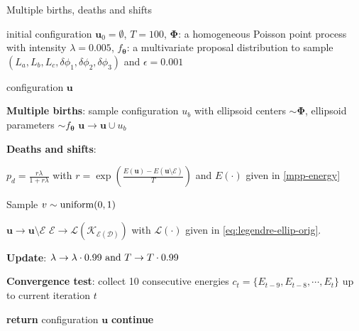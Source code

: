 \documentclass[journal]{IEEEtran}
\begin{document}
\begin{algorithm}
  \caption{Multiple births, deaths and shifts}
  \label{algo-mbds}
  \begin{algorithmic}[1]

    \REQUIRE initial configuration $\mathbf{u}_0 = \emptyset$,
    $T = 100$, $\mathbf{\Phi}$: a homogeneous Poisson point process
    with intensity $\lambda = 0.005$, $f_{\boldsymbol{\theta}}$: a
    multivariate proposal distribution to sample
    $ \left( L_a, L_b, L_c, \delta{\phi_1}, \delta{\phi_2},
      \delta{\phi_3} \right)$ and $\epsilon = 0.001$

    \ENSURE configuration $\mathbf{u}$

    \vspace{1mm} \REPEAT

    \vspace{1mm} \STATE \textbf{Multiple births}: sample configuration
    $u_b$ with ellipsoid centers $\sim \mathbf{\Phi}$, ellipsoid
    parameters $\sim f_{\boldsymbol{\theta}}$ \label{itr} \STATE
    $\mathbf{u} \rightarrow \mathbf{u} \cup u_b$

    \vspace{1mm} \STATE \textbf{Deaths and shifts}:

     \STATE
    $p_d = \frac{r\lambda}{1 + r\lambda}$ with
    $r = \exp \left( \frac{ E(\mathbf{u}) - E(\mathbf{u} \setminus
        \mathcal{E}) }{T} \right)$ and $E(\cdot)$ given in
    \eqref{mpp-energy}

    \STATE Sample $v \sim \textnormal{uniform}(0, 1)$

     \STATE
    $\mathbf{u} \rightarrow \mathbf{u} \setminus \mathcal{E}$ \ELSE
    \STATE
    $\mathcal{E} \rightarrow
    \mathcal{L(K_{\mathcal{E}(\mathcal{D})})}$ with
    $\mathcal{L}(\cdot)$ given in \eqref{eq:legendre-ellip-orig}.
    \ENDIF

    \ENDFOR

    \vspace{1mm} \STATE \textbf{Update}:
    $\lambda \rightarrow \lambda \cdot 0.99 \textnormal{ and } T
    \rightarrow T \cdot 0.99$

    \vspace{1mm} \STATE \textbf{Convergence test}: collect 10
    consecutive energies $c_t = \{E_{t-9}, E_{t-8}, \cdots, E_{t}\}$
    up to current iteration $t$

     \STATE \textbf{return} configuration $\mathbf{u}$
    \ELSE \STATE \textbf{continue}
    \ENDIF

  \end{algorithmic}
\end{algorithm}
\end{document}
